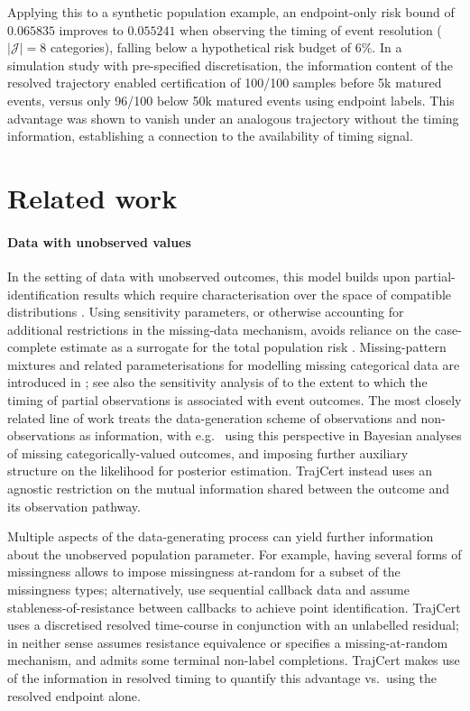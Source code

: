 Applying this to a synthetic population example, an endpoint-only risk bound of $0.065835$ improves to $0.055241$ when observing the timing of event resolution ($|\mathcal{J}|=8$ categories), falling below a hypothetical risk budget of $6\%$. In a simulation study with pre-specified discretisation, the information content of the resolved trajectory enabled certification of 100/100 samples before 5k matured events, versus only 96/100 below 50k matured events using endpoint labels. This advantage was shown to vanish under an analogous trajectory without the timing information, establishing a connection to the availability of timing signal.

\section{Related work}\label{sec:related} 
\paragraph{Data with unobserved values} 
In the setting of data with unobserved outcomes, this model builds upon partial-identification results which require characterisation over the space of compatible distributions \citep{manski2005}. Using sensitivity parameters, or otherwise accounting for additional restrictions in the missing-data mechanism, avoids reliance on the case-complete estimate as a surrogate for the total population risk \citep{carpenter2021}. Missing-pattern mixtures and related parameterisations for modelling missing categorical data are introduced in \citep{little1993}; see also the sensitivity analysis of \citet{shardell2009} to the extent to which the timing of partial observations is associated with event outcomes. The most closely related line of work treats the data-generation scheme of observations and non-observations as information, with e.g.\ \citep{dalygrafstein2026} using this perspective in Bayesian analyses of missing categorically-valued outcomes, and imposing further auxiliary structure on the likelihood for posterior estimation. TrajCert instead uses an agnostic restriction on the mutual information shared between the outcome and its observation pathway.

Multiple aspects of the data-generating process can yield further information about the unobserved population parameter. For example, having several forms of missingness allows \citet{jiang2018} to impose missingness at-random for a subset of the missingness types; alternatively, \citet{miao2025} use sequential callback data and assume stableness-of-resistance between callbacks to achieve point identification. TrajCert uses a discretised resolved time-course in conjunction with an unlabelled residual; in neither sense assumes resistance equivalence or specifies a missing-at-random mechanism, and admits some terminal non-label completions. TrajCert makes use of the information in resolved timing to quantify this advantage vs.\ using the resolved endpoint alone.

